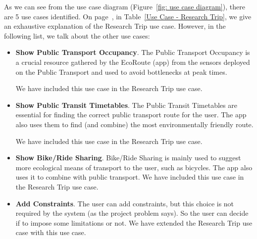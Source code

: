 \documentclass[a4paper]{article}
\begin{document}
    \noindent
    As we can see from the use case diagram (Figure~\ref{fig: use case diagram}), there are 5 use cases identified. On page~\pageref{Use Case - Research Trip}, in Table~\ref{Use Case - Research Trip}, we give an exhaustive explanation of the Research Trip use case. However, in the following list, we talk about the other use cases:
    \begin{itemize}
        \item \textbf{Show Public Transport Occupancy}. The Public Transport Occupancy is a crucial resource gathered by the EcoRoute (app) from the sensors deployed on the Public Transport and used to avoid bottlenecks at peak times. 
        
        We have included this use case in the Research Trip use case.

        \newpage

        \item \textbf{Show Public Transit Timetables}. The Public Transit Timetables are essential for finding the correct public transport route for the user. The app also uses them to find (and combine) the most environmentally friendly route. 
        
        We have included this use case in the Research Trip use case.


        \item \textbf{Show Bike/Ride Sharing}. Bike/Ride Sharing is mainly used to suggest more ecological means of transport to the user, such as bicycles. The app also uses it to combine with public transport. We have included this use case in the Research Trip use case.


        \item \textbf{Add Constraints}. The user can add constraints, but this choice is not required by the system (as the project problem says). So the user can decide if to impose some limitations or not. We have extended the Research Trip use case with this use case.
    \end{itemize}
    
\end{document}
